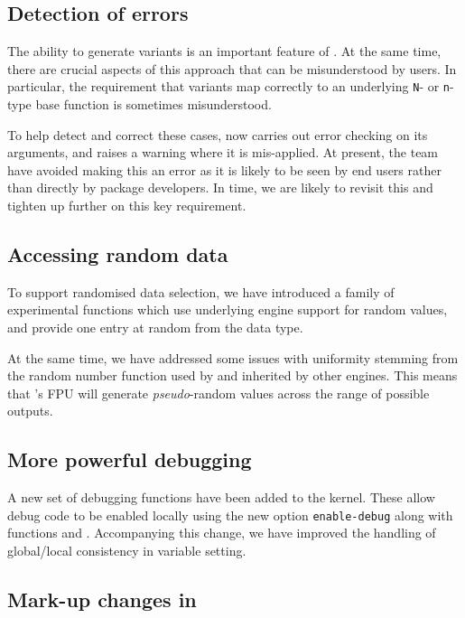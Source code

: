 \documentclass{ltnews}
\begin{document}
\subsection{Detection of  errors}

The ability to generate variants is an important feature of . At
the same time,  there are crucial aspects of this approach that can be
misunderstood by users. In particular, the requirement that variants map
correctly to an underlying \verb|N|- or \verb|n|-type base function is sometimes
misunderstood.

To help detect and correct these cases,  now
carries out error checking on its arguments, and raises a warning where
it is mis-applied. At present, the team have avoided making this an error
as it is likely to be seen by end users rather than directly by package
developers. In time, we are likely to revisit this and tighten up
further on this key requirement.

\subsection{Accessing random data}

To support randomised data selection, we have introduced a family of
experimental functions which use under\-lying engine support for random values,
and provide one entry at random from the data type.

At the same time, we have addressed some issues with uniformity stemming from
the random number function used by  and inherited by other
engines. This means that 's FPU will generate \emph{pseudo}-random
values across the range of possible outputs.

\subsection{More powerful debugging}

A new set of debugging functions have been added to the kernel. These allow
debug code to be enabled locally using the new option \verb|enable-debug| along
with functions  and . Accompanying this change, we
have improved the handling of global/local consistency in variable setting.

\subsection{Mark-up changes in }
\end{document}
